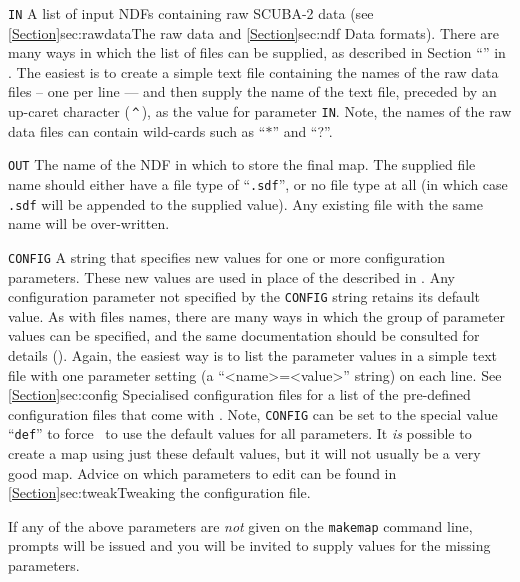 \begin{aligndesc}
\item[\texttt{IN}] A list of input NDFs containing raw SCUBA-2 data (see
\cref{Section}{sec:rawdata}{The raw data} and \cref{Section}{sec:ndf}
{Data formats}). There are many ways in which the list of files can be supplied,
as described in Section ``''
in . The easiest is to create a simple text
file containing the names of the raw data files -- one per line --- and
then supply the name of the text file, preceded by an up-caret character
(\,\texttt{\^{}}\,), as the value for parameter \texttt{IN}. Note, the names of
the raw data files can contain wild-cards such as ``$*$'' and ``?''.

\item[\texttt{OUT}] The name of the NDF in which to store the final
map. The supplied file name should either have a file type of
``\texttt{.sdf}'', or no file type at all (in which case \texttt{.sdf}
will be appended to the supplied value). Any existing file with the same
name will be over-written.

\item[\texttt{CONFIG}] A string that specifies new values for one or more
configuration parameters. These new values are used in place of the
 described in
. Any configuration parameter not specified by
the \texttt{CONFIG} string retains its default value. As with files
names, there are many ways in which the group of parameter values can be
specified, and the same documentation should be consulted for details
(). Again, the easiest way is to list the
parameter values in a simple text file with one parameter setting (a
``<name>=<value>'' string) on each line. See \cref{Section}{sec:config}
{Specialised configuration files} for a list of the pre-defined
configuration files that come with \smurf. Note, \texttt{CONFIG}
can be set to the special value ``\texttt{def}'' to force \makemap\ to
use the default values for all parameters. It \emph{is} possible to create
a map using just these default values, but it will not usually be a very
good map. Advice on which parameters to edit can be found in
\cref{Section}{sec:tweak}{Tweaking the configuration file}.

\end{aligndesc}

If any of the above parameters are \emph{not} given on the \texttt{makemap}
command line, prompts will be issued and you will be invited to supply values
for the missing parameters.


